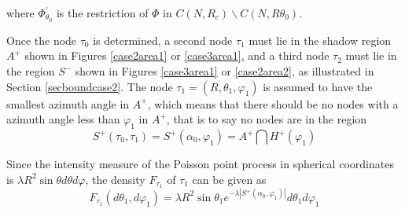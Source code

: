 \documentclass[journal, twoside]{IEEEtran}
\begin{document}
\begin{IEEEproof}
\noindent where $\Phi_{\theta_0}^\prime$ is the restriction of $\Phi$ in $C(N, R_c)
\backslash C(N, R\theta_0)$. 

Once the node $\tau_0$ is determined, a second node $\tau_1$ must lie in the shadow 
region $A^+$ shown in Figures \ref{case2area1} or \ref{case3area1}, and a third node $\tau_2$ must lie in the 
region $S^-$ shown in Figures \ref{case3area1} or \ref{case2area2}, as illustrated in Section \ref{secboundcase2}.
The node $\tau_1 = (R, \theta_1, \varphi_1)$ is assumed to have the smallest
azimuth angle in $A^+$, which means that there should be no nodes with a azimuth angle
less than $\varphi_1$ in $A^+$, that is to say no nodes are in the region
\begin{displaymath}
  S^+(\tau_0, \tau_1) =  S^+(\alpha_0, \varphi_1) = A^+ \bigcap H^+(\varphi_1)
\end{displaymath}

Since the intensity measure of the Poisson point process in spherical
coordinates is $\lambda R^2 \sin \theta d\theta d\varphi$, the density $F_{\tau_1}$ of
$\tau_1$ can be given as
\begin{equation} \label{eqdens1}
  F_{\tau_1} (d\theta_1, d\varphi_1) = \lambda R^2 \sin \theta_1 e^{-\lambda |S^+(\alpha_0, \varphi_1)|} d\theta_1 d\varphi_1
\end{equation}


\end{IEEEproof}
\end{document}
